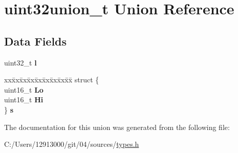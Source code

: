 \hypertarget{unionuint32union__t}{}\section{uint32union\+\_\+t Union Reference}
\label{unionuint32union__t}
\subsection*{Data Fields}
\begin{DoxyCompactItemize}
\item 
\hypertarget{unionuint32union__t_a02b7aaa4708411c52446dc5528f66c25}{}uint32\+\_\+t {\bfseries l}\label{unionuint32union__t_a02b7aaa4708411c52446dc5528f66c25}

\item 
\hypertarget{unionuint32union__t_a9d84b7d49ddab6b7cdf238460a750319}{}\begin{tabbing}
xx\=xx\=xx\=xx\=xx\=xx\=xx\=xx\=xx\=\kill
struct \{\\
\>uint16\_t {\bfseries Lo}\\
\>uint16\_t {\bfseries Hi}\\
\} {\bfseries s}\label{unionuint32union__t_a9d84b7d49ddab6b7cdf238460a750319}
\\

\end{tabbing}\end{DoxyCompactItemize}


The documentation for this union was generated from the following file\+:\begin{DoxyCompactItemize}
\item 
C\+:/\+Users/12913000/git/04/sources/\hyperlink{types_8h}{types.\+h}\end{DoxyCompactItemize}
